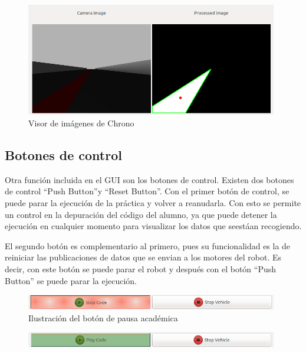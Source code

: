 \begin{figure}[H]
  \begin{center}
    \includegraphics[width=0.98\textwidth]{figures/visor_imagen_chrono.png}
		\caption{Visor de imágenes de Chrono}
		\label{fig.vich}
		\end{center}
\end{figure}

\subsection{Botones de control}
Otra función incluida en el GUI son los botones de control. Existen dos botones de control ``Push Button''y ``Reset Button''.
Con el primer botón de control, se puede parar la ejecución de la práctica y volver a reanudarla. Con esto se permite un control en la depuración del código del alumno, ya que puede detener la ejecución en cualquier momento para visualizar los datos que seestáan recogiendo.

El segundo botón es complementario al primero, pues su funcionalidad es la de reiniciar las publicaciones de datos que se envian a los motores del robot. Es decir, con este botón se puede parar el robot y después con el botón ``Push Button'' se puede parar la ejecución.

\begin{figure}[H]
	\begin{center}
	    \includegraphics[width=0.98\textwidth]{figures/boton_pausa_chrono.png}
		\caption{Ilustración del botón de pausa académica}
		\label{fig.bpch}
	\end{center}
\end{figure}
\begin{figure}[H]
	\begin{center}
        \includegraphics[width=0.98\textwidth]{figures/boton_start_chrono.png}
		\label{fig.bsch}
	\end{center}
\end{figure}


